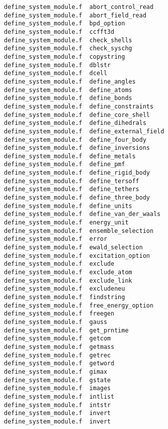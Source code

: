 \begin{verbatim}
define_system_module.f  abort_control_read        
define_system_module.f  abort_field_read          
define_system_module.f  bpd_option                
define_system_module.f  ccfft3d                   
define_system_module.f  check_shells              
define_system_module.f  check_syschg              
define_system_module.f  copystring                
define_system_module.f  dblstr                    
define_system_module.f  dcell                     
define_system_module.f  define_angles             
define_system_module.f  define_atoms              
define_system_module.f  define_bonds              
define_system_module.f  define_constraints        
define_system_module.f  define_core_shell         
define_system_module.f  define_dihedrals          
define_system_module.f  define_external_field     
define_system_module.f  define_four_body          
define_system_module.f  define_inversions         
define_system_module.f  define_metals             
define_system_module.f  define_pmf                
define_system_module.f  define_rigid_body         
define_system_module.f  define_tersoff            
define_system_module.f  define_tethers            
define_system_module.f  define_three_body         
define_system_module.f  define_units              
define_system_module.f  define_van_der_waals      
define_system_module.f  energy_unit               
define_system_module.f  ensemble_selection        
define_system_module.f  error                     
define_system_module.f  ewald_selection           
define_system_module.f  excitation_option         
define_system_module.f  exclude                   
define_system_module.f  exclude_atom              
define_system_module.f  exclude_link              
define_system_module.f  excludeneu                
define_system_module.f  findstring                
define_system_module.f  free_energy_option        
define_system_module.f  freegen                   
define_system_module.f  gauss                     
define_system_module.f  get_prntime               
define_system_module.f  getcom                    
define_system_module.f  getmass                   
define_system_module.f  getrec                    
define_system_module.f  getword                   
define_system_module.f  gimax                     
define_system_module.f  gstate                    
define_system_module.f  images                    
define_system_module.f  intlist                   
define_system_module.f  intstr                    
define_system_module.f  invert                    
define_system_module.f  invert                    

\end{verbatim}
